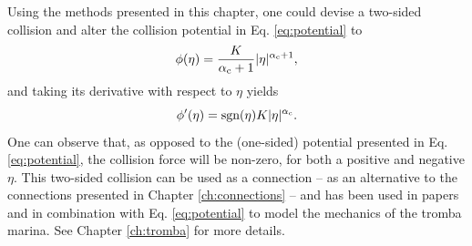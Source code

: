 % 

Using the methods presented in this chapter, one could devise a two-sided collision and alter the collision potential in Eq. \eqref{eq:potential} to \cite{Bilbao2019}
\begin{equation}\label{eq:twoSidedPotential}
    \phi(\eta) = \frac{K}{\alpha_{\text{c}}+1}|\eta|^{\alpha_{\text{c}}+1},
\end{equation}
and taking its derivative with respect to $\eta$ yields
\begin{equation}
    \phi'(\eta) = \text{sgn}(\eta)K|\eta|^{\alpha_{\text{c}}}.
\end{equation}
One can observe that, as opposed to the (one-sided) potential presented in Eq. \eqref{eq:potential}, the collision force will be non-zero, for both a positive and negative $\eta$. This two-sided collision can be used as a connection -- as an alternative to the connections presented in Chapter \ref{ch:connections} -- and has been used in papers \citeP[D] and \citeP[E] in combination with Eq. \eqref{eq:potential} to model the mechanics of the tromba marina. See Chapter \ref{ch:tromba} for more details.